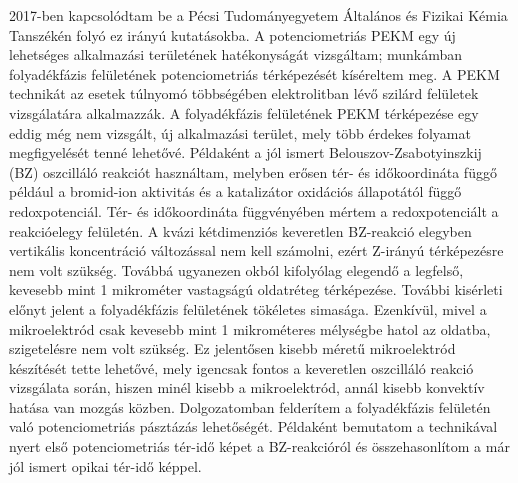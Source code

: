 2017-ben kapcsolódtam be a Pécsi Tudományegyetem Általános és Fizikai Kémia Tanszékén folyó ez irányú kutatásokba. A potenciometriás PEKM egy új lehetséges alkalmazási területének hatékonyságát vizsgáltam; munkámban folyadékfázis felületének potenciometriás térképezését kíséreltem meg. A PEKM technikát az esetek túlnyomó többségében elektrolitban lévő szilárd felületek vizsgálatára alkalmazzák. A folyadékfázis felületének PEKM térképezése egy eddig még nem vizsgált, új alkalmazási terület, mely több érdekes folyamat megfigyelését tenné lehetővé. Példaként a jól ismert Belouszov-Zsabotyinszkij (BZ) oszcilláló reakciót használtam, melyben erősen tér- és időkoordináta függő például a bromid-ion aktivitás és a katalizátor oxidációs állapotától függő redoxpotenciál. Tér- és időkoordináta függvényében mértem a redoxpotenciált a reakcióelegy felületén. A kvázi kétdimenziós keveretlen BZ-reakció elegyben vertikális koncentráció változással nem kell számolni, ezért Z-irányú térképezésre nem volt szükség. Továbbá ugyanezen okból kifolyólag elegendő a legfelső, kevesebb mint 1 mikrométer vastagságú oldatréteg térképezése. További kisérleti előnyt jelent a folyadékfázis felületének tökéletes simasága. Ezenkívül, mivel a mikroelektród csak kevesebb mint 1 mikrométeres mélységbe hatol az oldatba, szigetelésre nem volt szükség. Ez jelentősen kisebb méretű mikroelektród készítését tette lehetővé, mely igencsak fontos a keveretlen oszcilláló reakció vizsgálata során, hiszen minél kisebb a mikroelektród, annál kisebb konvektív hatása van mozgás közben. Dolgozatomban felderítem a folyadékfázis felületén való potenciometriás pásztázás lehetőségét. Példaként bemutatom a technikával nyert első potenciometriás tér-idő képet a BZ-reakcióról és összehasonlítom a már jól ismert opikai tér-idő képpel.
